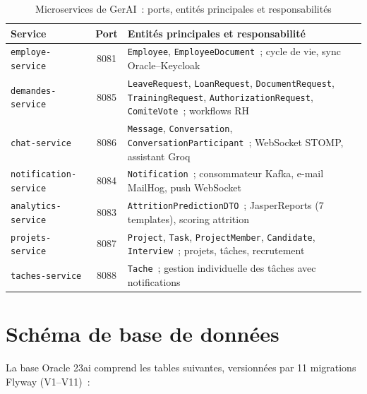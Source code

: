 \begin{table}[H]
\centering
\caption{Microservices de GerAI~: ports, entités principales et responsabilités}
\label{tab:services}
\begin{tabularx}{\textwidth}{|l|C|L|}
\hline
{}\textbf{Service} & \textbf{Port} & \textbf{Entités principales et responsabilité} \\\hline
{}
\texttt{employe-service} & 8081 & \texttt{Employee}, \texttt{EmployeeDocument}~; cycle de vie, sync Oracle--Keycloak \\\hline
\texttt{demandes-service} & 8085 & \texttt{LeaveRequest}, \texttt{LoanRequest}, \texttt{DocumentRequest}, \texttt{TrainingRequest}, \texttt{AuthorizationRequest}, \texttt{ComiteVote}~; workflows RH \\\hline
{}
\texttt{chat-service} & 8086 & \texttt{Message}, \texttt{Conversation}, \texttt{ConversationParticipant}~; WebSocket STOMP, assistant Groq \\\hline
\texttt{notification-service} & 8084 & \texttt{Notification}~; consommateur Kafka, e-mail MailHog, push WebSocket \\\hline
{}
\texttt{analytics-service} & 8083 & \texttt{AttritionPredictionDTO}~; JasperReports (7 templates), scoring attrition \\\hline
\texttt{projets-service} & 8087 & \texttt{Project}, \texttt{Task}, \texttt{ProjectMember}, \texttt{Candidate}, \texttt{Interview}~; projets, tâches, recrutement \\\hline
{}
\texttt{taches-service} & 8088 & \texttt{Tache}~; gestion individuelle des tâches avec notifications \\\hline
\end{tabularx}
\end{table}

\section{Schéma de base de données}

La base Oracle 23ai comprend les tables suivantes, versionnées par 11 migrations Flyway (V1--V11)~:

